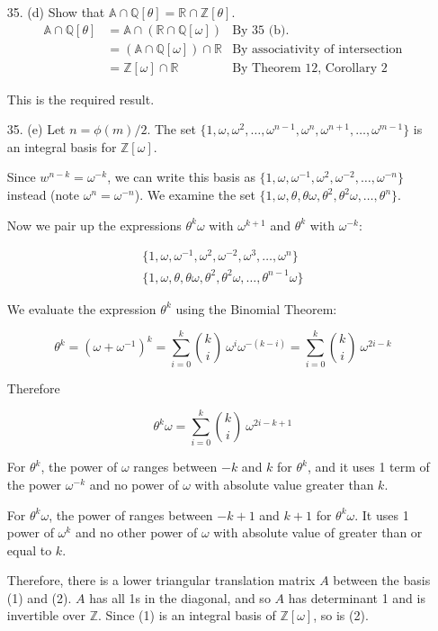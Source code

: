 \documentclass{article}
\newcommand{\w}[0]{\omega}
\newcommand{\Q}[0]{\mathbb{Q}}
\newcommand{\R}[0]{\mathbb{R}}
\newcommand{\Z}[0]{\mathbb{Z}}
\begin{document}
\begin{enumerate}
\item[35. (d)]  Show that $\mathbb{A} \cap \Q[\theta] = \R \cap \Z[\theta]$.
\begin{align*}
    \mathbb{A} \cap \Q[\theta]
        &= \mathbb{A} \cap (\R \cap \Q[\w]) & \text{By 35 (b).}\\
        &= (\mathbb{A} \cap \Q[\w]) \cap \R & \text{By associativity of intersection}\\
        &= \Z[\w] \cap \R & \text{By Theorem 12, Corollary 2}
\end{align*}

This is the required result.

\item[35. (e)] Let $n = \phi(m) / 2$.  The set $\{ 1, \w, \w^2, \ldots, \w^{n-1}, \w^{n}, \w^{n+1}, \ldots, \w^{m-1} \}$ is an integral basis for $\Z[\w]$.

Since $w^{n-k} = \w^{-k}$, we can write this basis as $\{1, \w, \w^{-1}, \w^2, \w^{-2}, \ldots, \w^{-n}\}$ instead (note $\w^{n} = \w^{-n}$).  We examine the set $\{1, \w, \theta, \theta\w, \theta^2, \theta^2\w, \ldots, \theta^{n} \}$.

Now we pair up the expressions $\theta^{k}\w$ with $\w^{k+1}$ and $\theta^{k}$ with $\w^{-k}$:

\begin{gather}
\{1, \w, \w^{-1}, \w^2,     \w^{-2},  \w^{3},     \ldots, \w^{n} \} \\
\{1, \w, \theta,  \theta\w, \theta^2, \theta^2\w, \ldots, \theta^{n-1}\w \}
\end{gather}

We evaluate the expression $\theta^{k}$ using the Binomial Theorem:

\[ \theta^{k} = (\w + \w^{-1})^k = \sum_{i = 0}^{k} \binom{k}{i}\ \w^{i} \w^{-(k-i)} = \sum_{i = 0}^{k} \binom{k}{i}\ \w^{2i - k} \]

Therefore

\[ \theta^{k}\w = \sum_{i = 0}^{k} \binom{k}{i}\ \w^{2i - k + 1} \]

For $\theta^{k}$, the power of $\w$ ranges between $-k$ and $k$ for $\theta^{k}$, and it uses 1 term of the power $\w^{-k}$ and no power of $\w$ with absolute value greater than $k$.

For $\theta^{k}\w$, the power of ranges between $-k + 1$ and $k + 1$ for $\theta^{k}\w$.  It uses 1 power of $\w^{k}$ and no other power of $\w$ with absolute value of greater than or equal to $k$.

Therefore, there is a lower triangular translation matrix $A$ between the basis (1) and (2).  $A$ has all 1s in the diagonal, and so $A$ has determinant 1 and is invertible over $\Z$.  Since (1) is an integral basis of $\Z[\w]$, so is (2).


\end{enumerate}
\end{document}
